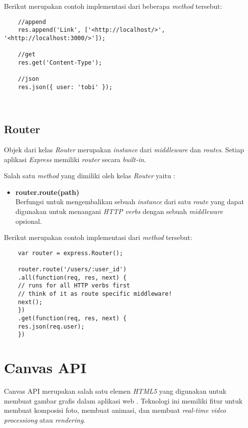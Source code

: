 Berikut merupakan contoh implementasi dari beberapa \textit{method} tersebut:

\begin{lstlisting}
	//append
	res.append('Link', ['<http://localhost/>', '<http://localhost:3000/>']);
	
	//get
	res.get('Content-Type');
	
	//json
	res.json({ user: 'tobi' });
	
	
\end{lstlisting}

\subsection{Router}
Objek dari kelas \textit{Router} merupakan \textit{instance} dari \textit{middleware} dan \textit{routes}. Setiap aplikasi \textit{Express} memiliki \textit{router} secara \textit{built-in}. 

Salah satu \textit{method} yang dimiliki oleh kelas \textit{Router} yaitu : 

\begin{itemize}
	\item \textbf{router.route(path)} \\ Berfungsi untuk mengembalikan sebuah \textit{instance} dari satu \textit{route} yang dapat digunakan untuk menangani \textit{HTTP verbs} dengan sebuah \textit{middleware} opsional.
	
\end{itemize}

Berikut merupakan contoh implementasi dari \textit{method} tersebut:

\begin{lstlisting}
	var router = express.Router();
	
	router.route('/users/:user_id')
	.all(function(req, res, next) {
	// runs for all HTTP verbs first
	// think of it as route specific middleware!
	next();
	})
	.get(function(req, res, next) {
	res.json(req.user);
	})
\end{lstlisting}


\section{Canvas API}
\label{sec:Canvas API}
 
Canvas API merupakan salah satu elemen \textit{HTML5} yang digunakan untuk membuat gambar grafis dalam aplikasi web \cite{canvas}. Teknologi ini memiliki fitur untuk membuat komposisi foto, membuat animasi, dan membuat \textit{real-time video processiong} atau \textit{rendering}. 

